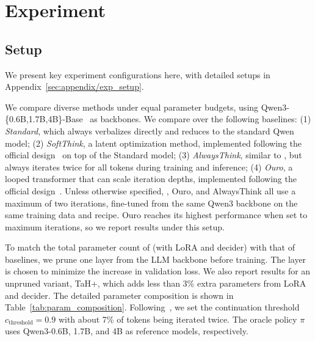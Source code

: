 \section{Experiment}
\label{sec:experiment}

\subsection{Setup}

We present key experiment configurations here, with detailed setups in Appendix~\ref{sec:appendix/exp_setup}.

We compare diverse methods under equal parameter budgets, using Qwen3-\{0.6B,1.7B,4B\}-Base~\citep{yang2025qwen3} as backbones.
We compare \name over the following baselines:
(1) \emph{Standard}, which always verbalizes directly and reduces to the standard Qwen model;
(2) \emph{SoftThink}, a latent optimization method, implemented following the official design~\citep{zhang2025soft} on top of the Standard model;
(3) \emph{AlwaysThink}, similar to \name, but always iterates twice for all tokens during training and inference;
(4) \emph{Ouro}, a looped transformer that can scale iteration depths, implemented following the official design~\citep{zhu2025ouro}.
Unless otherwise specified, \name, Ouro, and AlwaysThink all use a maximum of two iterations, fine-tuned from the same Qwen3 backbone on the same training data and recipe.
Ouro reaches its highest performance when set to maximum iterations, so we report results under this setup.

To match the total parameter count of \name (with LoRA and decider) with that of baselines, we prune one layer from the LLM backbone before training.
The layer is chosen to minimize the increase in validation loss. 
We also report results for an unpruned variant, TaH+, which adds less than 3\% extra parameters from LoRA and decider. 
The detailed parameter composition is shown in Table~\ref{tab:param_composition}. 
Following~\citep{fu2025r2r}, we set the continuation threshold $c_{\text{threshold}}=0.9$ with about 7\% of tokens being iterated twice.
The oracle policy $\pi$ uses Qwen3-0.6B, 1.7B, and 4B as reference models, respectively.

